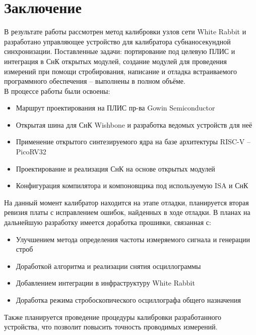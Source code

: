 \chapter*{Заключение} \label{ch-conclusion}

В результате работы рассмотрен метод калибровки узлов сети White Rabbit и 
разработано управляющее устройство для калибратора субнаносекундной синхронизации.
Поставленные задачи: портирование под целевую ПЛИС и интеграция в СнК открытых модулей, создание
модулей для проведения измерений при помощи стробирования, написание и отладка встраиваемого программного обеспечения -- выполнены в полном объёме.\\

\noindent В процессе работы были освоены:
\begin{itemize}
	\item Маршрут проектирования на ПЛИС пр-ва Gowin Semiconductor
	\item Открытая шина для СнК Wishbone и разработка ведомых устройств для неё
	\item Применение открытого синтезируемого ядра на базе архитектуры RISC-V -- PicoRV32
	\item Проектирование и реализация СнК на основе открытых модулей
	\item Конфигурация компилятора и компоновщика под используемую ISA и СнК\\
\end{itemize}

На данный момент калибратор находится на этапе отладки, планируется вторая ревизия платы с исправлением ошибок, найденных в ходе отладки.
В планах на дальнейшую разработку имеется доработка прошивки, связанная с:
\begin{itemize}
	\item Улучшением метода определения частоты измеряемого сигнала и генерации строб
	\item Доработкой алгоритма и реализации снятия осциллограммы
	\item Добавлением интеграции в инфраструктуру White Rabbit
	\item Доработка режима стробоскопического осциллографа общего назначения\\
\end{itemize}

Также планируется проведение процедуры калибровки разработанного устройства, что позволит повысить точность проводимых измерений.
